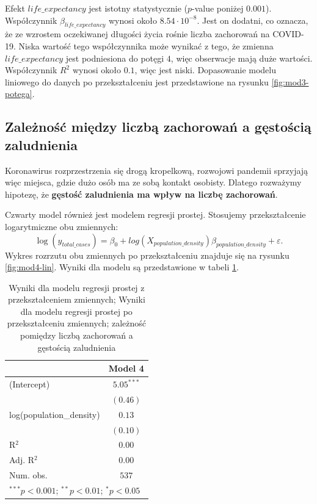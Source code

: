 \documentclass[12pt]{mwbk}
\theoremstyle{plain}
\theoremstyle{definition}
\theoremstyle{definition}
\newcommand\zrodlo[1]{\par\vspace{-3mm}{\small\textit{Źródło: }#1 }}
\begin{document}
Efekt $life\_expectancy$ jest istotny statystycznie ($p$-value poniżej $0.001$). Współczynnik $\beta_{life\_expectancy}$ wynosi około $8.54 \cdot 10^{-8}$. Jest on dodatni, co oznacza, że ze wzrostem oczekiwanej długości życia rośnie liczba zachorowań na COVID-19. Niska wartość tego współczynnika może wynikać z tego, że zmienna $life\_expectancy$ jest podniesiona do potęgi $4$, więc obserwacje mają duże wartości. Współczynnik $R^2$ wynosi około $0.1$, więc jest niski. Dopasowanie modelu liniowego do danych po przekształceniu jest przedstawione na rysunku \ref{fig:mod3-potega}.








\subsection{Zależność między liczbą zachorowań a gęstością zaludnienia}

Koronawirus rozprzestrzenia się drogą kropelkową, rozwojowi pandemii sprzyjają więc miejsca, gdzie dużo osób ma ze sobą kontakt osobisty. Dlatego rozważymy hipotezę, że \textbf{gęstość zaludnienia ma wpływ na liczbę zachorowań}.

Czwarty model również jest modelem regresji prostej. Stosujemy przekształcenie logarytmiczne obu zmiennych:
$$\log(y_{total\_cases})=\beta_0+log(X_{population\_density})\beta_{population\_density}+\varepsilon.$$
 Wykres rozrzutu obu zmiennych po przekształceniu znajduje się na rysunku \ref{fig:mod4-lin}.
Wyniki dla modelu są przedstawione w tabeli \ref{table:mod4}.



\begin{table}[!htbp]
	\begin{center}
		\caption{Wyniki dla modelu regresji prostej z przekształceniem zmiennych; Wyniki dla modelu regresji prostej po przekształceniu zmiennych; zależność pomiędzy liczbą zachorowań a gęstością zaludnienia}
		
		\begin{tabular}{l c}
			\hline
			& Model 4 \\
			\hline
			(Intercept)              & $5.05^{***}$ \\
			& $(0.46)$     \\
			log(population\_density) & $0.13$       \\
			& $(0.10)$     \\
			\hline
			R$^2$                    & $0.00$       \\
			Adj. R$^2$               & $0.00$       \\
			Num. obs.                & $537$        \\
			\hline
			\multicolumn{2}{l}{\scriptsize{$^{***}p<0.001$; $^{**}p<0.01$; $^{*}p<0.05$}}
		\end{tabular}
		
		\label{table:mod4}
		\vskip 0.5cm
	\zrodlo{Opracowanie własne} 
	\end{center}
\end{table}
\end{document}
